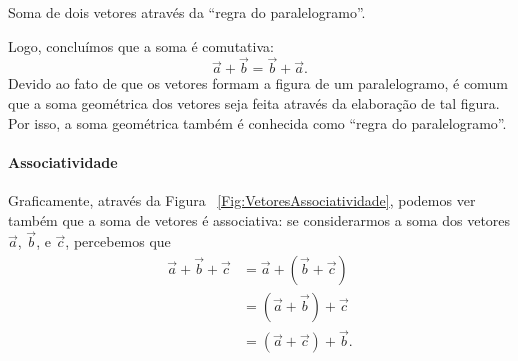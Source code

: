\begin{marginfigure}
\centering
{}
\caption{Soma de dois vetores através da ``regra do paralelogramo''. \label{Fig:RegraParalelogramoSoma}}
\end{marginfigure}

Logo, concluímos que a soma é comutativa:
\begin{equation}
  \vec{a} + \vec{b} = \vec{b} + \vec{a}.
\end{equation}
%
Devido ao fato de que os vetores formam a figura de um paralelogramo, é comum que a soma geométrica dos vetores seja feita através da elaboração de tal figura. Por isso, a soma geométrica também é conhecida como ``regra do paralelogramo''.

\paragraph{Associatividade}

Graficamente, através da Figura ~\ref{Fig:VetoresAssociatividade}, podemos ver também que a soma de vetores é associativa: se considerarmos a soma dos vetores $\vec{a}$, $\vec{b}$, e $\vec{c}$, percebemos que
\begin{align}
  \vec{a}+\vec{b} + \vec{c} &= \vec{a} + (\vec{b} + \vec{c}) \\
  &= (\vec{a}+\vec{b}) + \vec{c} \\
  &= (\vec{a}+\vec{c}) + \vec{b}.
\end{align}


